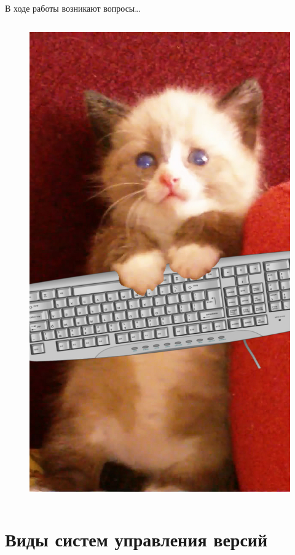 \documentclass[presentation]{beamer}
\begin{document}
\begin{frame}{В ходе работы возникают вопросы\ldots{}}
\begin{columns}
\begin{column}{0.4\textwidth}
\begin{figure}[htb]
        \includegraphics[width=1\textwidth]{chizhik-with-keyboard}
      \end{figure}
      \end{column}
  \end{columns}
\end{frame}



\section{Виды систем управления версий}
\end{document}
